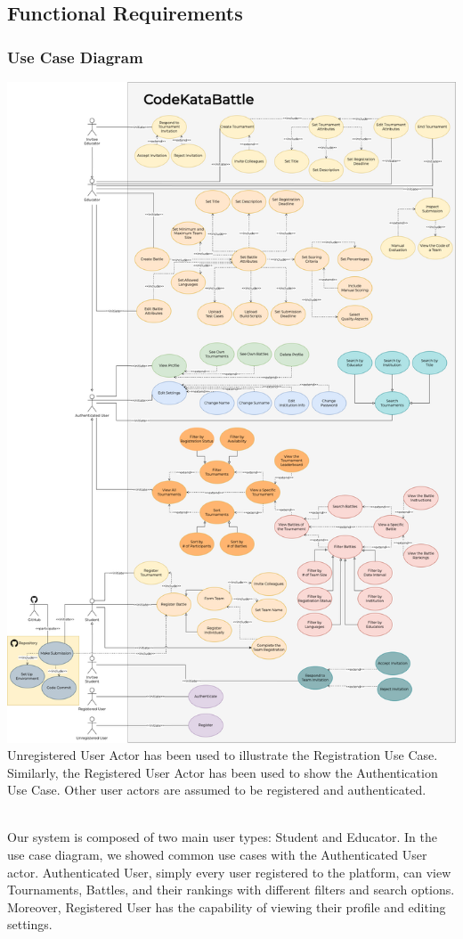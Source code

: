 \subsection{Functional Requirements}
\subsubsection{Use Case Diagram}
\label{sec:Use Case Diagram}
\includegraphics[scale=0.27]{Images/usecase-diagram.png}
\newpage
Unregistered User Actor has been used to illustrate the Registration Use Case. Similarly, the Registered User Actor has been used to show the Authentication Use Case. Other user actors are assumed to be registered and authenticated.

\\

Our system is composed of two main user types: Student and Educator. In the use case diagram, we showed common use cases with the Authenticated User actor. Authenticated User, simply every user registered to the platform, can view Tournaments, Battles, and their rankings with different filters and search options. Moreover, Registered User has the capability of viewing their profile and editing settings.

